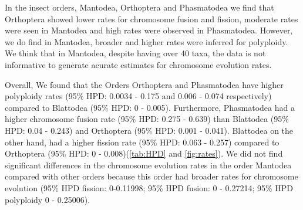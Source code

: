 In the insect orders, Mantodea, Orthoptera and Phasmatodea we find that Orthoptera showed lower rates for chromosome fusion and fission, moderate rates were seen in Mantodea and high rates were observed in Phasmatodea.
However, we do find in Mantodea, broader and higher rates were inferred for polyploidy.
We think that in Mantodea, despite having over 40 taxa, the data is not informative to generate acurate estimates for chromosome evolution rates.

Overall, We found that the Orders Orthoptera and Phasmatodea have higher polyploidy rates (95\% HPD: 0.0034 - 0.175 and 0.006 - 0.074 respectively) compared  to Blattodea (95\% HPD: 0 - 0.005).
Furthermore, Phasmatodea had a higher chromosome fusion rate (95\% HPD: 0.275 - 0.639) than Blattodea (95\% HPD: 0.04 - 0.243) and Orthoptera (95\% HPD: 0.001 - 0.041).
Blattodea on the other hand, had a higher fission rate (95\% HPD: 0.063 - 0.257) compared to Orthoptera (95\% HPD: 0 - 0.008)(\cref{tab:HPD} and \cref{fig:rates}).
We did not find significant differences in the chromosome evolution rates in the order Mantodea compared with other orders because this order had broader rates for chromosome evolution (95\% HPD fission: 0-0.11998; 95\% HPD fusion: 0 - 0.27214; 95\% HPD polyploidy 0 - 0.25006).






